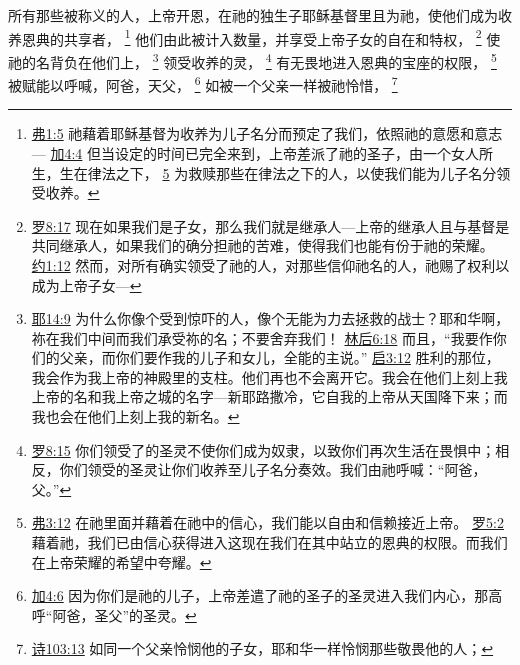 \documentclass[12pt, a4paper, oneside]{ctexart}
\begin{document}
所有那些被称义的人，上帝开恩，在祂的独生子耶稣基督里且为祂，使他们成为收养恩典的共享者，
	\footnote {
		\href{https://biblehub.com/ephesians/1-5.htm}{弗1:5} 祂藉着耶稣基督为收养为儿子名分而预定了我们，依照祂的意愿和意志---
		\href{https://biblehub.com/galatians/4-4.htm}{加4:4} 但当设定的时间已完全来到，上帝差派了祂的圣子，由一个女人所生，生在律法之下，
		\href{https://biblehub.com/galatians/4-5.htm}{5} 为救赎那些在律法之下的人，以使我们能为儿子名分领受收养。
	}
	他们由此被计入数量，并享受上帝子女的自在和特权，
	\footnote {
		\href{https://biblehub.com/romans/8-17.htm}{罗8:17} 现在如果我们是子女，那么我们就是继承人---上帝的继承人且与基督是共同继承人，如果我们的确分担祂的苦难，使得我们也能有份于祂的荣耀。
		\href{https://biblehub.com/john/1-12.htm}{约1:12} 然而，对所有确实领受了祂的人，对那些信仰祂名的人，祂赐了权利以成为上帝子女---
	}
	使祂的名背负在他们上，
	\footnote {
		\href{https://biblehub.com/jeremiah/14-9.htm}{耶14:9} 为什么你像个受到惊吓的人，像个无能为力去拯救的战士？耶和华啊，祢在我们中间而我们承受祢的名；不要舍弃我们！
		\href{https://biblehub.com/2_corinthians/6-18.htm}{林后6:18} 而且，“我要作你们的父亲，而你们要作我的儿子和女儿，全能的主说。”
		\href{https://biblehub.com/revelation/3-12.htm}{启3:12} 胜利的那位，我会作为我上帝的神殿里的支柱。他们再也不会离开它。我会在他们上刻上我上帝的名和我上帝之城的名字---新耶路撒冷，它自我的上帝从天国降下来；而我也会在他们上刻上我的新名。
	}
	领受收养的灵，
	\footnote {
		\href{https://biblehub.com/romans/8-15.htm}{罗8:15} 你们领受了的圣灵不使你们成为奴隶，以致你们再次生活在畏惧中；相反，你们领受的圣灵让你们收养至儿子名分奏效。我们由祂呼喊：“阿爸，父。”
	}
	有无畏地进入恩典的宝座的权限，
	\footnote {
		\href{https://biblehub.com/ephesians/3-12.htm}{弗3:12} 在祂里面并藉着在祂中的信心，我们能以自由和信赖接近上帝。
		\href{https://biblehub.com/romans/5-2.htm}{罗5:2} 藉着祂，我们已由信心获得进入这现在我们在其中站立的恩典的权限。而我们在上帝荣耀的希望中夸耀。
	}
	被赋能以呼喊，阿爸，天父，
	\footnote {
		\href{https://biblehub.com/galatians/4-6.htm}{加4:6} 因为你们是祂的儿子，上帝差遣了祂的圣子的圣灵进入我们内心，那高呼“阿爸，圣父”的圣灵。
	}
	如被一个父亲一样被祂怜惜，
	\footnote {
		\href{https://biblehub.com/psalms/103-13.htm}{诗103:13} 如同一个父亲怜悯他的子女，耶和华一样怜悯那些敬畏他的人；
	}
\end{document}
